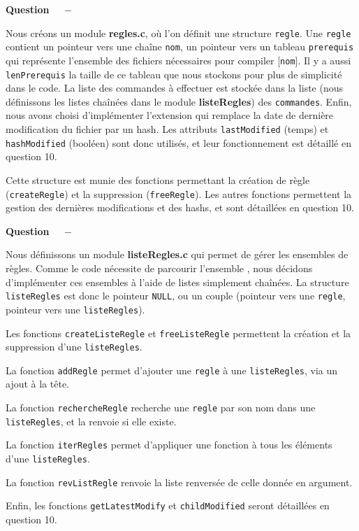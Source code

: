 \documentclass[11pt]{report}
\newcounter{question}[section]
\newenvironment{question}[1][]{\refstepcounter{question}\par\medskip
   \noindent\textbf{Question~\thequestion ~ $-$} \rmfamily}{}
\begin{document}
\newpage


\begin{question} %

Nous créons un module \textbf{regles.c}, où l'on définit une structure \texttt{regle}. Une \texttt{regle} contient un pointeur vers une chaîne \texttt{nom}, un pointeur vers un tableau \texttt{prerequis} qui représente l'ensemble des fichiers nécessaires pour compiler [\texttt{nom}]. Il y a aussi \texttt{lenPrerequis} la taille de ce tableau que nous stockons pour plus de simplicité dans le code. La liste des commandes à effectuer est stockée dans la liste (nous définissons les listes chaînées dans le module \textbf{listeRegles}) des \texttt{commandes}. Enfin, nous avons choisi d'implémenter l'extension qui remplace la date de dernière modification du fichier par un hash. Les attributs \texttt{lastModified} (temps) et \texttt{hashModified} (booléen) sont donc utilisés, et leur fonctionnement est détaillé en question 10.


Cette structure est munie des fonctions permettant la création de règle (\texttt{createRegle}) et la suppression (\texttt{freeRegle}). Les autres fonctions permettent la gestion des dernières modifications et des hashs, et sont détaillées en question 10.

\end{question}

\begin{question} %

Nous définissons un module \textbf{listeRegles.c} qui permet de gérer les ensembles de règles. Comme le code nécessite de parcourir l'ensemble , nous décidons d'implémenter ces ensembles à l'aide de listes simplement chaînées.
La structure \texttt{listeRegles} est donc le pointeur \texttt{NULL}, ou un couple (pointeur vers une \texttt{regle}, pointeur vers une \texttt{listeRegles}).

Les fonctions \texttt{createListeRegle} et \texttt{freeListeRegle} permettent la création et la suppression d'une \texttt{listeRegles}.

La fonction \texttt{addRegle} permet d'ajouter une \texttt{regle} à une \texttt{listeRegles}, via un ajout à la tête.

La fonction \texttt{rechercheRegle} recherche une \texttt{regle} par son nom dans une \texttt{listeRegles}, et la renvoie si elle existe.

La fonction \texttt{iterRegles} permet d'appliquer une fonction à tous les éléments d'une \texttt{listeRegles}. 

La fonction \texttt{revListRegle} renvoie la liste renversée de celle donnée en argument.

Enfin, les fonctions \texttt{getLatestModify} et \texttt{childModified} seront détaillées en question 10.



\end{question}
\end{document}
